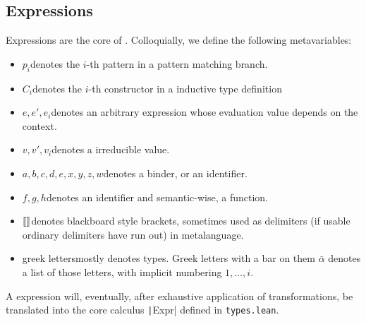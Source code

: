 \documentclass[a4paper, 11pt]{article}
\theoremstyle{remark}\newtheorem*{remark}{Remark}
\theoremstyle{definition}\newtheorem*{definition}{Definition}
\begin{document}
\subsection{Expressions}
Expressions are the core of \Tigris. Colloquially, we define the following metavariables:
\begin{itemize}
  \item \(p_i\)\quad denotes the \(i\)-th pattern in a pattern matching branch.
  \item \(C_i\)\quad denotes the \(i\)-th constructor in a inductive type definition
  \item \(e, e', e_i\)\quad denotes an arbitrary expression whose evaluation value depends on the context.
  \item \(v, v', v_i\)\quad denotes a irreducible value.
  \item \(a, b, c, d, e, x, y, z, w\)\quad denotes a binder, or an identifier.
  \item \(f, g, h\)\quad denotes an identifier and semantic-wise, a function.
  \item \(\llbracket  \rrbracket\)\quad denotes blackboard style brackets, sometimes used
    as delimiters (if usable ordinary delimiters have run out) in metalanguage.
  \item greek letters\quad mostly denotes types. Greek letters with a bar on them \(\bar{\alpha}\) denotes
    a list of those letters, with implicit numbering \(1,\dots,i\).
\end{itemize}
A \Tigris expression will, eventually, after exhaustive application of transformations,
be translated into the core calculus \texttt|Expr| defined in \texttt{types.lean}.
\end{document}
